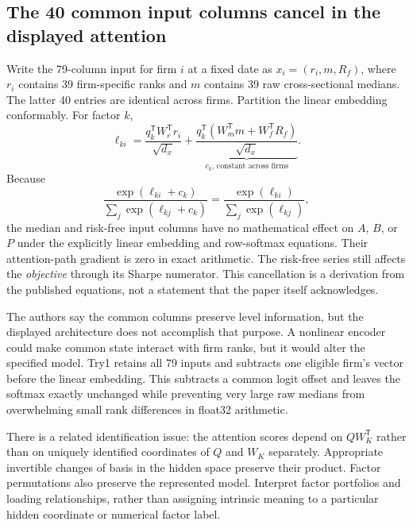 \documentclass[11pt]{article}
\begin{document}
\subsection{The 40 common input columns cancel in the displayed attention}
\label{sec:constant-cancellation}

Write the 79-column input for firm $i$ at a fixed date as
$x_i=(r_i,m,R_f)$, where $r_i$ contains 39 firm-specific ranks and
$m$ contains 39 raw cross-sectional medians. The latter 40 entries are
identical across firms. Partition the linear embedding conformably.
For factor $k$,
\begin{equation}
 \ell_{ki}=\frac{q_k^{\mathsf T}W_r^{\mathsf T}r_i}{\sqrt{d_x}}
 +\underbrace{\frac{q_k^{\mathsf T}
 (W_m^{\mathsf T}m+W_f^{\mathsf T}R_f)}{\sqrt{d_x}}}_{c_k\text{, constant across firms}}.
\end{equation}
Because
\begin{equation}
 \frac{\exp(\ell_{ki}+c_k)}{\sum_j\exp(\ell_{kj}+c_k)}
 =\frac{\exp(\ell_{ki})}{\sum_j\exp(\ell_{kj})},
 \label{eq:common-cancellation}
\end{equation}
the median and risk-free input columns have no mathematical effect on
$A$, $B$, or $P$ under the explicitly linear embedding and row-softmax
equations. Their attention-path gradient is zero in exact arithmetic.
The risk-free series still affects the \emph{objective} through its
Sharpe numerator. This cancellation is a derivation from the published
equations, not a statement that the paper itself acknowledges.

The authors say the common columns preserve level information, but
the displayed architecture does not accomplish that purpose. A
nonlinear encoder could make common state interact with firm ranks,
but it would alter the specified model. Try1 retains all 79 inputs and
subtracts one eligible firm's vector before the linear embedding.
This subtracts a common logit offset and leaves the softmax exactly
unchanged while preventing very large raw medians from overwhelming
small rank differences in float32 arithmetic.

There is a related identification issue: the attention scores depend
on $QW_K^{\mathsf T}$ rather than on uniquely identified coordinates
of $Q$ and $W_K$ separately. Appropriate invertible changes of basis
in the hidden space preserve their product. Factor permutations also
preserve the represented model. Interpret factor portfolios and
loading relationships, rather than assigning intrinsic meaning to a
particular hidden coordinate or numerical factor label.
\end{document}

